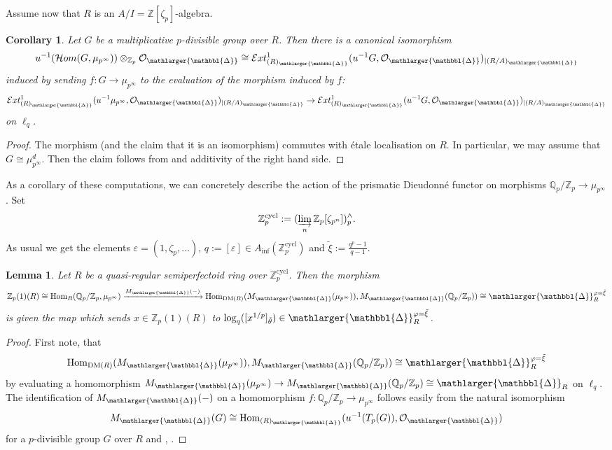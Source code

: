 \documentclass{amsart}
\newcommand{\prism}{{\mathlarger{\mathbbl{\Delta}}}}
\theoremstyle{plain}
\newtheorem{lemma}[theorem]{Lemma}
\newtheorem{corollary}[theorem]{Corollary}
\theoremstyle{definition}
\renewcommand{\inf}{\mathrm{inf}}
\newcommand{\Q}{\mathbb{Q}}
\newcommand{\tilxi}{\tilde{\xi}}
\newcommand{\Z}{\mathbb{Z}}
\begin{document}
Assume now that $R$ is an $A/I=\Z[\zeta_p]$-algebra.

\begin{corollary}
  \label{sec:prism-dieud-modul-corollary-description-of-prismatic-dieudonne-module-for-multiplicatives}
  Let $G$ be a multiplicative $p$-divisible group over $R$. Then there is a canonical isomorphism
  $$
  u^{-1}(\mathcal{H}om(G,\mu_{p^\infty})) \otimes_{\Z_p} \mathcal{O}_{\prism} \cong \mathcal{E}xt_{(R)_{\prism}}^1(u^{-1}G,\mathcal{O}_{\prism})_{|(R/A)_\prism}
  $$
  induced by sending $f\colon G\to \mu_{p^\infty}$ to the evaluation of the morphism induced by $f$:
 \[ \mathcal{E}xt_{(R)_{\prism}}^1(u^{-1}\mu_{p^{\infty}},\mathcal{O}_{\prism})_{|(R/A)_\prism} \to \mathcal{E}xt_{(R)_{\prism}}^1(u^{-1}G,\mathcal{O}_{\prism})_{|(R/A)_\prism} \]
 on $\ell_q$.
\end{corollary}
\begin{proof}
The morphism (and the claim that it is an isomorphism) commutes with \'etale localisation on $R$. In particular, we may assume that $G\cong \mu_{p^\infty}^d$. Then the claim follows from  and additivity of the right hand side.  
\end{proof}

As a corollary of these computations, we can concretely describe the action of the prismatic Dieudonn\'e functor on morphisms $\Q_p/\Z_p\to \mu_{p^\infty}$.
Set
$$
\Z_p^{\mathrm{cycl}}:=(\varinjlim\limits_n\Z_p[\zeta_{p^n}])^{\wedge}_p.
$$
As usual we get the elements $\varepsilon=(1,\zeta_p,\ldots)$, $q:=[\varepsilon]\in A_\inf(\Z_p^{\mathrm{cycl}})$ and $\tilxi:=\frac{q^p-1}{q-1}$.

\begin{lemma}
  \label{sec:prism-dieud-modul-lemma-identifiaction-of-prismatic-dieudonne-functor-on-morphisms} Let $R$ be a quasi-regular semiperfectoid ring over $\Z_p^{\mathrm{cycl}}$. Then the morphism
  $$
  \Z_p(1)(R)\cong \mathrm{Hom}_R(\Q_p/\Z_p,\mu_{p^\infty})\xrightarrow{M_{\prism}(-)} \mathrm{Hom}_{\mathrm{DM}(R)}(M_{\prism}(\mu_{p^\infty})),M_{\prism}(\Q_p/\Z_p))\cong \prism_{R}^{\varphi=\tilxi}
  $$
  is given the map which sends $x\in \Z_p(1)(R)$ to $\log_q([x^{1/p}]_{\tilde{\theta}})\in \prism_R^{\varphi=\tilxi}$.
\end{lemma}
\begin{proof}
  First note, that
  $$
  \mathrm{Hom}_{\mathrm{DM}(R)}(M_{\prism}(\mu_{p^\infty})),M_{\prism}(\Q_p/\Z_p))\cong \prism_{R}^{\varphi=\tilxi}
  $$
  by evaluating a homomorphism $M_{\prism}(\mu_{p^\infty})\to M_{\prism}(\Q_p/\Z_p)\cong \prism_R$ on $\ell_q$. The identification of $M_{\prism}(-)$ on a homomorphism $f\colon \Q_p/\Z_p\to \mu_{p^\infty}$ follows easily from the natural isomorphism
  $$
  M_{\prism}(G)\cong \mathrm{Hom}_{(R)_{\prism}}(u^{-1}(T_p(G)),\mathcal{O}_\prism)
  $$
  for a $p$-divisible group $G$ over $R$ and , .
\end{proof}
\end{document}
